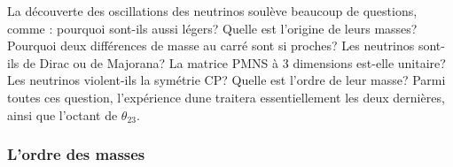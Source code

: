       La découverte des oscillations des neutrinos soulève beaucoup de questions, comme : pourquoi sont-ils aussi légers? Quelle est l'origine de leurs masses? Pourquoi deux différences de masse au carré sont si proches? Les neutrinos sont-ils de Dirac ou de Majorana? La matrice PMNS à 3 dimensions est-elle unitaire? Les neutrinos violent-ils la symétrie CP? Quelle est l'ordre de leur masse? Parmi toutes ces question, l'expérience \gls{dune} traitera essentiellement les deux dernières, ainsi que l'octant de $\theta_{23}$.

%		        
%	            
%	            


      \subsubsection{L'ordre des masses}\label{sec::hierarchy}

